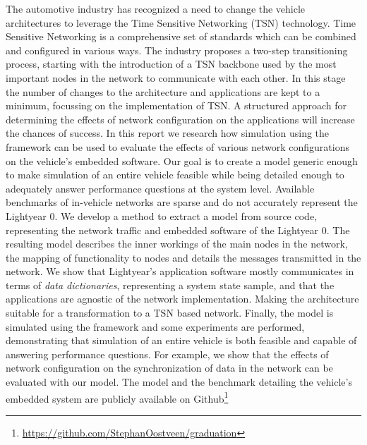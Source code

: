 The automotive industry has recognized a need to change the vehicle architectures to leverage the Time Sensitive Networking (TSN) technology. Time Sensitive Networking is a comprehensive set of standards which can be combined and configured in various ways. The industry proposes a two-step transitioning process, starting with the introduction of a TSN backbone used by the most important nodes in the network to communicate with each other. In this stage the number of changes to the architecture and applications are kept to a minimum, focussing on the implementation of TSN. A structured approach for determining the effects of network configuration on the applications will increase the chances of success. In this report we research how simulation using the \omnet framework can be used to evaluate the effects of various network configurations on the vehicle's embedded software. Our goal is to create a model generic enough to make simulation of an entire vehicle feasible while being detailed enough to adequately answer performance questions at the system level. Available benchmarks of in-vehicle networks are sparse and do not accurately represent the Lightyear 0. We develop a method to extract a model from source code, representing the network traffic and embedded software of the Lightyear 0. The resulting model describes the inner workings of the main nodes in the network, the mapping of functionality to nodes and details the messages transmitted in the network. We show that Lightyear's application software mostly communicates in terms of \textit{data dictionaries}, representing a system state sample, and that the applications are agnostic of the network implementation. Making the architecture suitable for a transformation to a TSN based network. Finally, the model is simulated using the \omnet framework and some experiments are performed, demonstrating that simulation of an entire vehicle is both feasible and capable of answering performance questions. For example, we show that the effects of network configuration on the synchronization of data in the network can be evaluated with our model. The \omnet model and the benchmark detailing the vehicle's embedded system are publicly available on Github\footnote{\url{https://github.com/StephanOostveen/graduation}}

